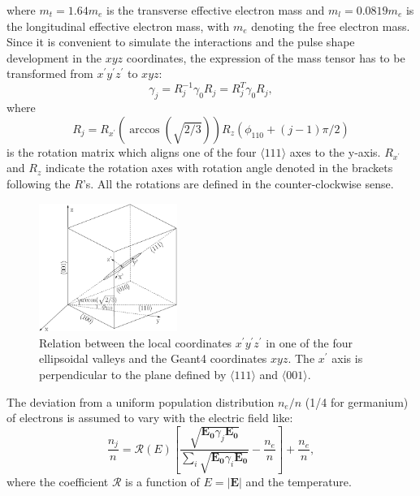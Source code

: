 where $m_{t} = 1.64m_{e}$ is the transverse effective electron mass and $m_{l} = 0.0819m_{e}$ is the longitudinal effective electron mass, with $m_{e}$ denoting the free electron mass. Since it is convenient to simulate the interactions and the pulse shape development in the $xyz$ coordinates, the expression of the mass tensor has to be transformed from $x^{\prime}y^{\prime}z^{\prime}$ to $xyz$:
\begin{equation}
\label{eq:pss:gs}
\gamma_{j} = R_{j}^{-1}\gamma_{0}R_{j} = R_{j}^{T}\gamma_{0}R_{j},
\end{equation}
where
\begin{equation}
\label{eq:pss:rs}
R_{j} = R_{x^{\prime}}(\arccos(\sqrt{2/3}))R_{z}(\phi_{110}+(j-1)\pi/2)
\end{equation}
is the rotation matrix which aligns one of the four $\langle 111 \rangle$ axes to the y-axis. $R_{x^{\prime}}$ and $R_{z}$ indicate the rotation axes with rotation angle denoted in the brackets following the $R$'s. All the rotations are defined in the counter-clockwise sense.

\begin{figure}
\centering
\includegraphics[width=0.4\textwidth]{axes}  
\caption{Relation between the local coordinates $x^{\prime}y^{\prime}z^{\prime}$ in one of the four ellipsoidal valleys and the Geant4 coordinates $xyz$. The $x^{\prime}$ axis is perpendicular to the plane defined by $\langle111\rangle$ and $\langle001\rangle$.}
\label{fig:pss:axes}
\end{figure}

The deviation from a uniform population distribution $n_{e}/n$ (1/4 for germanium) of electrons is assumed to vary with the electric field like:
\begin{equation}
\label{eq:pss:nion}
\frac{n_{j}}{n} = \mathcal{R}(E) \left[ \frac{\sqrt{\mathbf{E_{0}}\gamma_{j}\mathbf{E_{0}}}}
{\sum_{i}\sqrt{\mathbf{E_{0}}\gamma_{i}\mathbf{E_{0}}}} - \frac{n_{e}}{n} \right] + \frac{n_{e}}{n}, 
\end{equation}
where the coefficient $\mathcal{R}$ is a function of $E=|\mathbf{E}|$ and the temperature.

